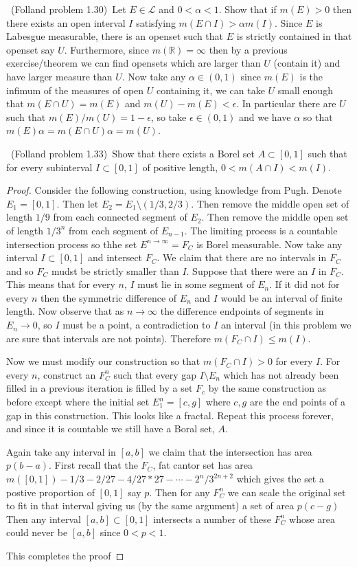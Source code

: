 \documentclass[11pt]{amsart}
\theoremstyle{definition}
\numberwithin{theorem}{section}
\numberwithin{definition}{section}
\numberwithin{equation}{section}
\def\scriptl{{\mathcal L}}
\begin{document}
\medskip {}\ 
(Folland problem 1.30)\ 
Let $E\in\scriptl$ and $0<\alpha<1$. Show that if $m(E)>0$
then there exists an open interval $I$ satisfying $m(E\cap I) > \alpha m(I)$.
Since $E$ is Labesgue measurable, there is an openset such that $E$ is strictly contained in that openset say $U$. Furthermore, since $m(\mathbb{R}) = \infty$ then by a previous exercise/theorem we can find opensets which are larger than $U$ (contain it) and have larger measure than $U$. Now take any $\alpha \in (0,1)$ since $m(E)$ is the infimum of the measures of open $U$ containing it, we can take $U$ small enough that $m(E \cap U) = m(E)$ and $m(U) - m(E) < \epsilon.$ In particular  there are $U$ such that $m(E)/m(U) = 1- \epsilon$, so take $\epsilon \in (0, 1)$ and we have $\alpha$ so that $m(E)\alpha = m(E \cap U)\alpha = m(U)$. 

\medskip \noindent {\bf (3.9)}\ 
(Folland problem 1.33)\ 
Show that there exists a Borel set $A\subset[0,1]$
such that for every subinterval $I\subset[0,1]$
of positive length, $0<m(A\cap I)<m(I)$.
\begin{proof}
	Consider the following construction, using knowledge from Pugh. Denote $E_1 = [0,1]$. Then let $E_2 = E_1 \setminus (1/3, 2/3)$. Then remove the middle open set of length $1/9$ from each connected segment of $E_2$. Then remove the middle open set of length $1/3^n$ from each segment of $E_{n-1}$. The limiting process is a countable intersection process so thhe set $E^{n\to\infty} = F_C$ is Borel measurable. Now take any interval $I \subset [0,1]$ and intersect $F_C$. We claim that there are no intervals in $F_C$ and so $F_C$ mudst be strictly smaller than $I$. Suppose that there were an $I$ in $F_C$. This means that for every $n$, $I$ must lie in some segment of $E_n$. If it did not for every $n$ then the symmetric difference of $E_n$ and $I$ would be an interval of finite length. Now observe that as $n\to \infty$ the  difference endpoints of segments in $E_n \to 0$, so $I$ must be a point, a contradiction to $I$ an interval (in this problem we are sure that intervals are not points). Therefore $m(F_C \cap I) \leq m(I)$.

	Now we must modify our construction so that $m(F_C \cap I) > 0$ for every $I$. For every $n$, construct an $F_C^n$ such that every gap $I \setminus E_n$ which has not already been filled in a previous iteration is filled by a set $F_c$ by the same construction as before except where the initial set $E_1^n = [c,g]$ where $c,g$ are the end points of a gap in this construction. This looks like a fractal. Repeat this process forever, and since it is countable we still have a Boral set, $A$.

	Again take any interval in $[a,b]$ we claim that the intersection has area $p(b-a)$. First recall that the $F_C$, fat cantor set has area $m([0,1]) - 1/3 - 2/27 - 4/27*27 -\cdots -2^n/3^{2n+2}$ which gives the set a postive proportion of $[0,1]$ say $p$. Then for any $F_C^n$ we can scale the original set to fit in that interval giving us (by the same argument) a set of area $p(c-g)$ Then any interval $[a,b] \subset [0,1]$ intersects a number of these $F_C^n$ whose area could never be $[a,b]$ since $0 < p < 1$.

	This completes the proof
\end{proof}
\end{document}
